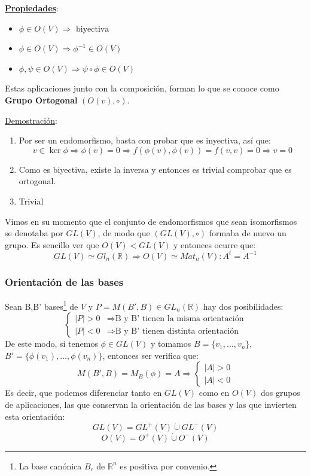 \documentclass[10pt,a4paper,openright]{book}
\theoremstyle{break}
\begin{document}
\underline{\textbf{Propiedades}}:
\begin{itemize}
\item $\phi \in O(V)\Rightarrow \mbox{ biyectiva}$
\item $\phi\in O(V)\Rightarrow \phi^{-1}\in O(V)$
\item $\phi,\psi \in O(V)\Rightarrow \psi \circ \phi \in O(V)$
\end{itemize}
Estas aplicaciones junto con la composición, forman lo que se conoce como \textbf{Grupo Ortogonal} $\left(O(v),\circ \right)$.

\underline{Demostración}:
\begin{enumerate}
\item Por ser un endomorfismo, basta con probar que es inyectiva, así que:
$$v\in \ker \phi \Rightarrow \phi(v) = 0 \Rightarrow f(\phi (v), \phi (v)) = f(v,v) = 0 \Rightarrow v= 0$$
\item Como es biyectiva, existe la inversa y entonces es trivial comprobar que es ortogonal.
\item Trivial
\end{enumerate}

Vimos en su momento que el conjunto de endomorfismos que sean isomorfismos se denotaba por $GL(V)$, de modo que $(GL(V),\circ)$ formaba de nuevo un grupo. Es sencillo ver que $O(V)<GL(V)$ y entonces ocurre que:
$$GL(V)\simeq Gl_n(\mathbb R)\Rightarrow O(V)\simeq Mat_n(V): A^t = A^{-1}$$

\subsubsection*{Orientación de las bases}
Sean B,B' bases\footnote{La base canónica $B_c$ de $\mathbb{R}^n$ es positiva por convenio.} de $V$ y $P=M(B',B) \in GL_n(\mathbb{R})$ hay dos posibilidades:
$$\begin{cases} |P|>0 & \Rightarrow \mbox{B y B' tienen la misma orientación} \\ |P|<0 & \Rightarrow \mbox{B y B' tienen distinta orientación} \end{cases}$$
De este modo, si tenemos $\phi \in GL(V)$ y tomamos $B=\{ v_1, \ldots, v_n\}$, $B'=\{ \phi(v_1), \ldots, \phi(v_n)\}$, entonces ser verifica que:
$$M(B', B) = M_B (\phi) = A\Rightarrow \begin{cases} |A| > 0 \\ |A| < 0 \end{cases}$$
Es decir, que podemos diferenciar tanto en $GL(V)$ como en $O(V)$ dos grupos de aplicaciones, las que conservan la orientación de las bases y las que invierten esta orientación:
$$GL(V) = GL^+ (V) \dot{\cup} GL^- (V)$$
$$O(V) = O^+ (V) \dot{\cup} O^- (V)$$
\end{document}
